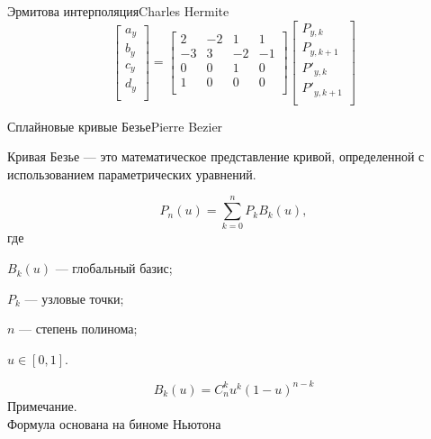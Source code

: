 \documentclass{beamer}
\begin{document}
\begin{frame}{Эрмитова интерполяция}{Charles Hermite}
{		\[
			\begin{bmatrix}
				a_y \\
				b_y \\
				c_y \\
				d_y \\
			\end{bmatrix}
			=
			\begin{bmatrix}
				2 & -2 & 1 & 1 \\
				-3 & 3 & -2 & -1 \\
				0 & 0 & 1 & 0 \\
				1 & 0 & 0 & 0 \\
			\end{bmatrix}
			\begin{bmatrix}
				P_{y,k} \\
				P_{y,k+1} \\
				P'_{y,k} \\
				P'_{y,k+1} \\
			\end{bmatrix}
		\]
		}

	\end{frame}

	\begin{frame}{Сплайновые кривые Безье}{Pierre Bezier}

		Кривая Безье --- это математическое представление кривой, определенной с использованием параметрических уравнений.

		\[
			P_n(u) = \sum_{k = 0}^{n}	P_k B_k(u)
			,
		\]
		где 
		
		$B_k (u)$ --- глобальный базис;

		$P_k$ --- узловые точки;

		
		$n$ --- степень полинома;

		$u \in [0,1]$.

		\[
			B_k (u) = C_n^k u^k (1 - u)^{n-k}	
		\]
		Примечание. \\ Формула основана на биноме Ньютона


	\end{frame}
\end{document}

